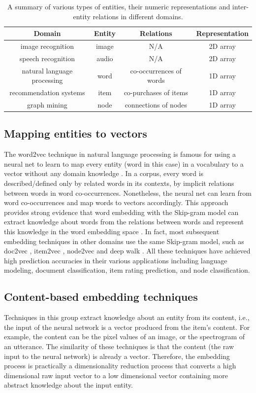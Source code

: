 \documentclass[12pt]{WSUThesis}
\theoremstyle{definition}
\begin{document}
\begin{table}[!ht]\centering
	\caption{
		A summary of various types of entities, their numeric
		representations and inter-entity relations in different domains.
	}
	\begin{tabular}{cccc} \hline \rowcolor{blue!30}
		Domain & Entity & Relations & Representation \\ \hline
		image recognition & image & N/A & 2D array \\ \hline
		speech recognition & audio  & N/A & 2D array \\ \hline
		natural language processing & word   & co-occurrences of words & 1D array \\ \hline
		recommendation systems & item   & co-purchases of items & 1D array \\ \hline
		graph mining & node & connections of nodes & 1D array \\ \hline
	\end{tabular}
	\label{tab:domains}
\end{table}

\subsection{Mapping entities to vectors}
The word2vec technique in natural language processing is famous for using a neural net to learn to map every 
entity (word in this case) in a vocabulary to a vector without any domain 
knowledge \cite{mikolov2013distributed}.
In a corpus, every word is described/defined only by related words in its 
contexts, by implicit relations between words in word co-occurrences.
Nonetheless, the neural net can learn from word co-occurrences and map words to 
vectors accordingly.
This approach provides strong evidence that word embedding with the Skip-gram model can extract knowledge about words from the relations between words and represent this knowledge in the word embedding space \cite{mikolov2013linguistic}.
In fact, most subsequent embedding techniques in other domains use the same Skip-gram model, such as
doc2vec \cite{le2014distributed},
item2vec \cite{barkan2016item2vec},
node2vec \cite{grover2016node2vec} and
deep walk \cite{perozzi2014deepwalk}.
All these techniques have achieved high prediction accuracies in their various applications including language modeling, document classification, item rating prediction, and node classification.

\subsection{Content-based embedding techniques}
Techniques in this group extract knowledge about an entity from its content, 
i.e., the input of the neural network is a vector produced from the item's content.
For example, the content can be the pixel values of an image, or the spectrogram of an utterance.
The similarity of these techniques is that the content (the raw input to the neural network) is already a vector.
Therefore, the embedding process is practically a dimensionality reduction process
that converts a high dimensional raw input vector to a low dimensional vector 
containing more abstract knowledge about the input entity.
\end{document}
